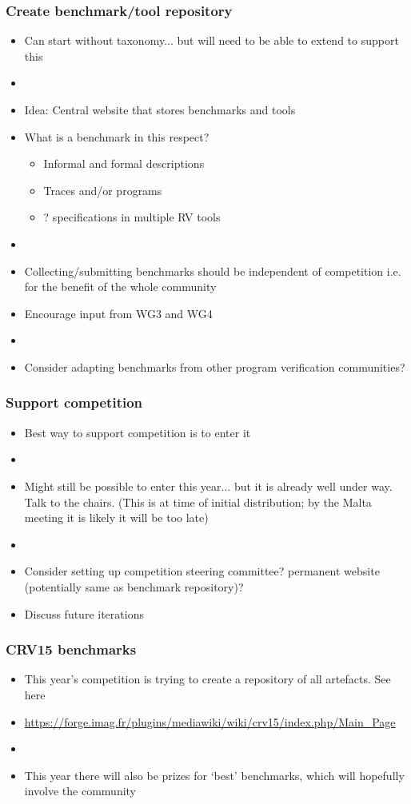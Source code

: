 \documentclass{beamer}
\begin{document}
\begin{frame}
\frametitle{Create benchmark/tool repository}
\begin{itemize}
	\item Can start without taxonomy... but will need to be able to extend to support this
	\item[]
	\item Idea: Central website that stores benchmarks and tools
	\item What is a benchmark in this respect?
	\begin{itemize}
		\item Informal and formal descriptions
		\item Traces and/or programs
		\item ? specifications in multiple RV tools
	\end{itemize}
	\item[]
	\item Collecting/submitting benchmarks should be independent of competition i.e. for the benefit of the whole community
	\item Encourage input from WG3 and WG4
	\item[]
	\item Consider adapting benchmarks from other program verification communities?
\end{itemize}
\end{frame}

\begin{frame}
\frametitle{Support competition}
\begin{itemize}
	\item Best way to support competition is to enter it
	\item[]
	\item Might still be possible to enter this year... but it is already well under way. Talk to the chairs. (This is at time of initial distribution; by the Malta meeting it is likely it will be too late)
	\item[]
	\item Consider setting up competition steering committee? permanent website (potentially same as benchmark repository)?
	\item Discuss future iterations
\end{itemize}
\end{frame}

\begin{frame}
\frametitle{CRV15 benchmarks}
\begin{itemize}
	\item This year's competition is trying to create a repository of all artefacts. See here
	\item[] \url{https://forge.imag.fr/plugins/mediawiki/wiki/crv15/index.php/Main_Page}
	\item[]
	\item This year there will also be prizes for `best' benchmarks, which will hopefully involve the community
\end{itemize}
\end{frame}
\end{document}
